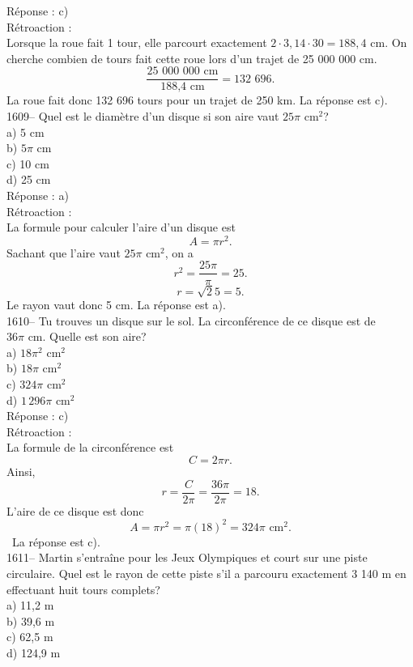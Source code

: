 R\'eponse : c)\\

R\'etroaction :\\
Lorsque la roue fait 1 tour, elle parcourt exactement $2\cdot 3,14
\cdot 30=188,4{\textrm{ cm.}}$ On cherche combien de tours fait
cette roue lors d'un trajet de 25 000 000 cm.
$$\frac{\textrm{25 000 000 cm}}{\textrm{188,4 cm}}={\textrm{132 696.}}$$ La
roue fait
donc 132 696 tours pour un trajet de 250 km. La r\'eponse est c).\\

1609-- Quel est le diam\`etre d'un disque si son aire vaut
$25\pi{\textrm{ cm}}^2$?\\
a) 5 cm\\
b) $5\pi$ cm\\
c) 10 cm \\
d) 25 cm\\

R\'eponse : a)\\

R\'etroaction :\\
La formule pour calculer l'aire d'un disque est $$A=\pi r^2.$$
Sachant que l'aire vaut $25\pi{\textrm{ cm}}^2$, on a
$$r^2=\frac{25\pi}{\pi}=25.$$ $$r=\sqrt 25=5.$$ Le rayon vaut donc 5
cm. La r\'eponse est a).\\

1610-- Tu trouves un disque sur le sol. La circonf\'erence de ce
disque est de $36\pi{\textrm{ cm}}$. Quelle est son aire?\\
a) $18\pi^2{\textrm{ cm}}^2$\\
b) $18\pi {\textrm{ cm}}^2$\\
c) $324\pi {\textrm{ cm}}^2$\\
d) $1\,296\pi {\textrm{ cm}}^2$\\

R\'eponse : c)\\

R\'etroaction :\\
La formule de la circonf\'erence est $$C=2\pi r.$$Ainsi,
$$r=\frac{C}{2\pi}=\frac{36\pi}{2\pi}=18.$$L'aire de ce disque est
donc $$A=\pi r^2=\pi (18)^2=324\pi{\textrm{ cm}}^2.$$\ La r\'eponse
est c).\\

1611-- Martin s'entra\^ine pour les Jeux Olympiques et court sur une
piste circulaire. Quel est le rayon de cette piste s'il a parcouru
exactement 3 140 m en effectuant huit tours complets?\\
a) 11,2 m \\
b) 39,6 m \\
c) 62,5 m\\
d) 124,9 m\\

